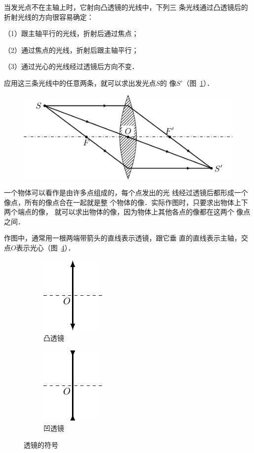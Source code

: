 当发光点不在主轴上时，它射向凸透镜的光线中，下列三
条光线通过凸透镜后的折射光线的方向很容易确定：

（1）跟主轴平行的光线，折射后通过焦点；

（2）通过焦点的光线，折射后跟主轴平行；

（3）通过光心的光线经过透镜后方向不变．


应用这三条光线中的任意两条，就可以求出发光点$S$的
像$S'$（图~\ref{fig_C_5-40}）．
\begin{figure}[htbp]
    \centering
    \includegraphics{fig/C/5-40.pdf}
    \caption{}\label{fig_C_5-40}
\end{figure}

一个物体可以看作是由许多点组成的，每个点发出的光
线经过透镜后都形成一个像点，所有的像点合在一起就是整
个物体的像．实际作图时，只要求出物体上下两个端点的像，
就可以求出物体的像，因为物体上其他各点的像都在这两个
像点之间．

作图中，通常用一根两端带箭头的直线表示透镜，跟它垂
直的直线表示主轴，交点$O$表示光心（图~\ref{fig_C_5-41}）．
\begin{figure}[htbp]
    \centering
    \begin{subfigure}{0.2\linewidth}
        \centering
        \includegraphics{fig/C/5-41a.pdf}
        \caption{凸透镜}\label{fig_C_5-41a}
    \end{subfigure}
    \hfil
    \begin{subfigure}{0.2\linewidth}
        \centering
        \includegraphics{fig/C/5-41b.pdf}
        \caption{凹透镜}\label{fig_C_5-41b}
    \end{subfigure}
    \caption{透镜的符号}\label{fig_C_5-41}
\end{figure}

